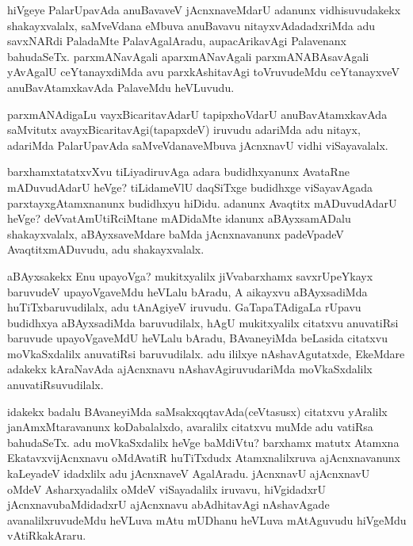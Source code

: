 \begin{artha}
hiVgeye PalarUpavAda anuBavaveV jAcnxnaveMdarU adanunx vidhisuvudakekx
shakayxvalalx, saMveVdana eMbuva anuBavavu nitayxvAdadadxriMda adu
savxNARdi PaladaMte PalavAgalAradu, aupacArikavAgi Palavenanx
bahudaSeTx. parxmANavAgali aparxmANavAgali parxmANABAsavAgali yAvAgalU
ceYtanayxdiMda avu parxkAshitavAgi toVruvudeMdu ceYtanayxveV
anuBavAtamxkavAda PalaveMdu heVLuvudu.

parxmANAdigaLu vayxBicaritavAdarU tapipxhoVdarU anuBavAtamxkavAda
saMvitutx avayxBicaritavAgi(tapapxdeV) iruvudu adariMda adu nitayx,
adariMda PalarUpavAda saMveVdanaveMbuva jAcnxnavU vidhi viSayavalalx.
\end{artha}

\centerline{}

\begin{artha}
barxhamxtatatxvXvu tiLiyadiruvAga adara budidhxyanunx AvataRne
mADuvudAdarU heVge? tiLidameVlU daqSiTxge budidhxge viSayavAgada
parxtayxgAtamxnanunx budidhxyu hiDidu. adanunx Avaqtitx mADuvudAdarU
heVge? deVvatAmUtiRciMtane mADidaMte idanunx aBAyxsamADalu
shakayxvalalx, aBAyxsaveMdare baMda jAcnxnavanunx padeVpadeV
AvaqtitxmADuvudu, adu shakayxvalalx.
\end{artha}

\centerline{}

\begin{artha}
aBAyxsakekx Enu upayoVga? mukitxyalilx jiVvabarxhamx savxrUpeYkayx
baruvudeV upayoVgaveMdu heVLalu bAradu, A aikayxvu aBAyxsadiMda
huTiTxbaruvudilalx, adu tAnAgiyeV iruvudu. GaTapaTAdigaLa rUpavu
budidhxya aBAyxsadiMda baruvudilalx, hAgU mukitxyalilx citatxvu
anuvatiRsi baruvude upayoVgaveMdU heVLalu bAradu, BAvaneyiMda beLasida
citatxvu moVkaSxdalilx anuvatiRsi baruvudilalx. adu ililxye
nAshavAgutatxde, EkeMdare adakekx kAraNavAda ajAcnxnavu
nAshavAgiruvudariMda moVkaSxdalilx anuvatiRsuvudilalx.

idakekx badalu BAvaneyiMda saMsakxqqtavAda(ceVtasusx) citatxvu
yAralilx janAmxMtaravanunx koDabalalxdo, avaralilx citatxvu muMde adu
vatiRsa bahudaSeTx. adu moVkaSxdalilx heVge baMdiVtu? barxhamx matutx
Atamxna EkatavxvijAcnxnavu oMdAvatiR huTiTxdudx Atamxnalilxruva
ajAcnxnavanunx kaLeyadeV idadxlilx adu jAcnxnaveV
AgalAradu. jAcnxnavU ajAcnxnavU oMdeV Asharxyadalilx oMdeV
viSayadalilx iruvavu, hiVgidadxrU jAcnxnavubaMdidadxrU ajAcnxnavu
abAdhitavAgi nAshavAgade avanalilxruvudeMdu heVLuva mAtu mUDhanu heVLuva
mAtAguvudu hiVgeMdu vAtiRkakAraru.
\end{artha}

